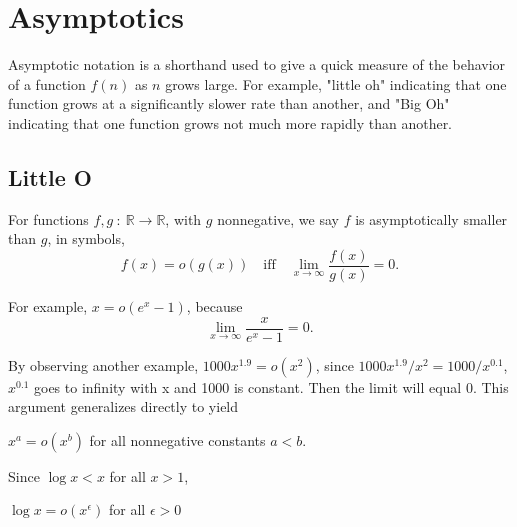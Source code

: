 \chapter{Asymptotics}

Asymptotic notation is a shorthand used to give a quick measure of the behavior of a function \(f(n)\) as \(n\) grows large. For example, "little oh" indicating that one function grows at
a significantly slower rate than another, and "Big Oh" indicating that one function grows not much more rapidly than another.

\section{Little O}

\begin{definition}
    For functions \(f, g\ :\ \mathbb{R} \to \mathbb{R}\), with \(g\) nonnegative, we say \(f\) is asymptotically smaller than \(g\), in symbols,
    \[
        f(x) = o(g(x))\quad\text{iff}\quad\lim_{x \to \infty} \dfrac{f(x)}{g(x)} = 0. 
    \]
\end{definition}
For example, \(x = o(e^x - 1)\), because 
\[
    \lim_{x \to \infty} \dfrac{x}{e^x - 1} = 0.
\]

By observing another example, \(1000x^{1.9} = o(x^2)\), since \(1000x^{1.9} / x^2 = 1000 / x^0.1\), \(x^{0.1}\) goes to infinity with x and 1000 is constant. Then the limit will equal 0. This argument generalizes directly to yield
\begin{lemma}
    \(x^a = o(x^b)\) for all nonnegative constants \(a < b\).
\end{lemma}

Since \(\log x < x\) for all \(x > 1\), 
\begin{lemma}
    \(\log x = o(x^\epsilon)\) for all \(\epsilon > 0\)
\end{lemma}

\begin{corollary}
    
\end{corollary}